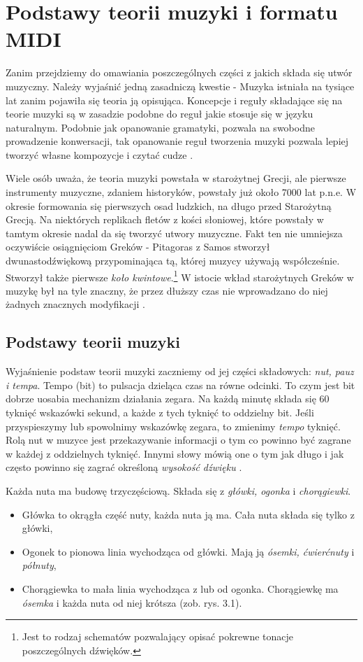 \chapter{Podstawy teorii muzyki i formatu MIDI} 
Zanim przejdziemy do omawiania poszczególnych części z jakich składa się utwór muzyczny. Należy wyjaśnić jedną zasadniczą kwestie - Muzyka istniała na tysiące lat zanim pojawiła się teoria ją opisująca.
Koncepcje i reguły składające się na teorie muzyki są w zasadzie podobne do reguł jakie stosuje się w języku naturalnym. Podobnie jak opanowanie gramatyki, pozwala na swobodne prowadzenie konwersacji, tak opanowanie reguł tworzenia muzyki pozwala lepiej tworzyć własne kompozycje i czytać cudze \citep[s. 22]{Pilhofer2018}.

Wiele osób uważa, że teoria muzyki powstała w starożytnej Grecji, ale pierwsze instrumenty muzyczne, zdaniem historyków, powstały już około 7000 lat p.n.e. W okresie formowania się pierwszych osad ludzkich, na długo przed Starożytną Grecją. Na niektórych replikach fletów z kości słoniowej, które powstały w tamtym okresie nadal da się tworzyć utwory muzyczne. Fakt ten nie umniejsza oczywiście osiągnięciom Greków - Pitagoras z Samos stworzył dwunastodźwiękową przypominająca tą, której muzycy używają współcześnie. Stworzył także pierwsze \textit{koło kwintowe}.\footnote{Jest to rodzaj schematów pozwalający opisać pokrewne tonacje poszczególnych dźwięków.} W istocie wkład starożytnych Greków w muzykę był na tyle znaczny, że przez dłuższy czas nie wprowadzano do niej żadnych znacznych modyfikacji \citep[s. 23]{Pilhofer2018}.

\section{Podstawy teorii muzyki} 
Wyjaśnienie podstaw teorii muzyki zaczniemy od jej części składowych: \textit{nut, pauz i tempa}.
Tempo (bit) to pulsacja dzieląca czas na równe odcinki. To czym jest bit dobrze uosabia mechanizm działania zegara. Na każdą minutę składa się 60 tyknięć wskazówki sekund, a każde z tych tyknięć to oddzielny bit. Jeśli przyspieszymy lub spowolnimy wskazówkę zegara, to zmienimy \textit{tempo} tyknięć. Rolą nut w muzyce jest przekazywanie informacji o tym co powinno być zagrane w każdej z oddzielnych tyknięć. Innymi słowy mówią one o tym jak długo i jak często powinno się zagrać określoną \textit{wysokość dźwięku} \citep[s. 31]{Pilhofer2018}.

Każda nuta ma budowę trzyczęściową. Składa się z \textit{główki, ogonka} i \textit{chorągiewki}.
\begin{itemize}
 \item Główka to okrągła część nuty, każda nuta ją ma. Cała nuta składa się tylko z główki,
 \item Ogonek to pionowa linia wychodząca od główki. Mają ją \textit{ósemki, ćwierćnuty} i \textit{półnuty},
 \item Chorągiewka to mała linia wychodząca z lub od ogonka. Chorągiewkę ma \textit{ósemka} i każda nuta od niej krótsza \citep[s. 32-33]{Pilhofer2018} (zob. rys. 3.1).
\end{itemize}

